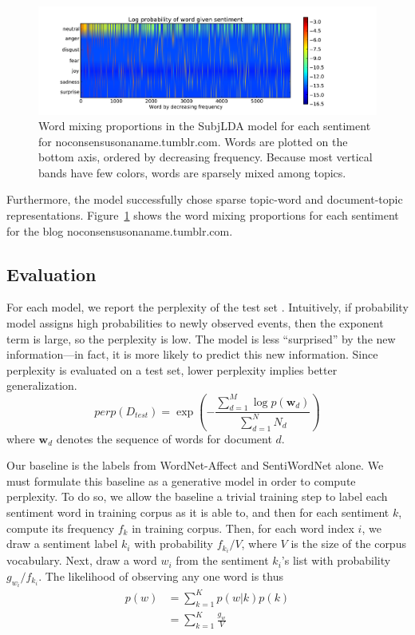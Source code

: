 \documentclass{article}
\begin{document}
\begin{figure}
\centering
\includegraphics[width=\textwidth, trim=15mm 0mm 40mm 0mm, clip]{sentiment_heatmap}
\caption{Word mixing proportions in the SubjLDA model for each
sentiment for noconsensusonaname.tumblr.com. Words are plotted on
the bottom axis, ordered by decreasing frequency. Because most vertical
bands have few colors, words are sparsely mixed among topics.
\label{fig:sparse}}
\end{figure}

Furthermore, the model successfully chose sparse topic-word
and document-topic representations. Figure~\ref{fig:sparse} shows
the word mixing proportions for each sentiment for the blog
noconsensusonaname.tumblr.com.

\subsection{Evaluation}
For each model, we report the perplexity of the test set \citep{blei03}.
Intuitively, if probability model assigns high probabilities to
newly observed events, then the exponent term is large, so the
perplexity is low. The model is less ``surprised'' by the new
information---in fact, it is more likely to predict this new
information. Since perplexity is evaluated on a test set, lower
perplexity implies better generalization.
\begin{equation}
perp(D_{test}) = \exp{\left(-\frac{\sum_{d=1}^M \log{p(\mathbf{w}_d)}}{\sum_{d=1}^N N_d}\right)}
\end{equation}
where $\mathbf{w}_d$ denotes the sequence of words for document
$d$.

Our baseline is the labels from WordNet-Affect and SentiWordNet
alone.  We must formulate this baseline as a generative model in
order to compute perplexity. To do so, we allow the baseline a
trivial training step to label each sentiment word in training
corpus as it is able to, and then for each sentiment $k$, compute
its frequency $f_k$ in training corpus.  Then, for each word index
$i$, we draw a sentiment label $k_i$ with probability $f_{k_i} /
V$, where $V$ is the size of the corpus vocabulary. Next, draw a
word $w_i$ from the sentiment $k_i$'s list with probability $g_{w_i}
/ f_{k_i}$. The likelihood of observing any one word is thus
\begin{equation} \label{eqn:base-likelihood}
\begin{aligned}
p(w) &= \sum_{k=1}^K p(w|k) p(k) \\
     &= \sum_{k=1}^K \frac{g_w}{V}
\end{aligned}
\end{equation}
\end{document}
